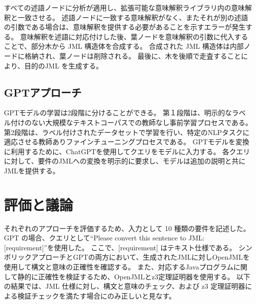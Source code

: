 \documentclass[uplatex, twocolumn,10pt]{jsarticle} %
\begin{document}
すべての述語ノードに分析が適用し、拡張可能な意味解釈ライブラリ内の意味解釈と一致させる。
述語ノードに一致する意味解釈がなく、またそれが別の述語の引数である場合は、意味解釈を提供する必要があることを示すエラーが発生する。
意味解釈を述語に対応付けした後、葉ノードを意味解釈の引数に代入することで、部分木から JML 構造体を合成する。
合成された JML 構造体は内部ノードに格納され、葉ノードは削除される。
最後に、木を後順で走査することにより、目的のJML を生成する。

\subsection{GPTアプローチ}
GPTモデル\cite{2}の学習は2段階に分けることができる。
第１段階は、明示的なラベル付けのない大規模なテキストコーパスでの教師なし事前学習プロセスである。
第2段階は、ラベル付けされたデータセットで学習を行い、特定のNLPタスクに適応させる教師ありファインチューニングプロセスである。
GPTモデルを変換に利用するために、ChatGPTを使用してクエリをモデルに入力する。
各クエリに対して、要件のJMLへの変換を明示的に要求し、モデルは追加の説明と共にJMLを提供する。

\section{評価と議論}
\label{sec:evaluation}
それぞれのアプローチを評価するため、入力として 10 種類の要件を記述した。
GPT の場合、クエリとして“Please convert this sentence to JML: [requirement]”を使用した。
ここで、[requirement] はテキスト仕様である。
シンボリックアプローチとGPTの両方において、生成されたJMLに対しOpenJML\cite{4}を使用して構文と意味の正確性を確認する。
また、対応するJavaプログラムに関して静的に正確性を検証するため、OpenJMLとz3\cite{5}定理証明器を使用する。
以下の結果では、JML 仕様に対し、構文と意味のチェック、および z3 定理証明器による検証チェックを満たす場合にのみ正しいと見なす。
\end{document}
